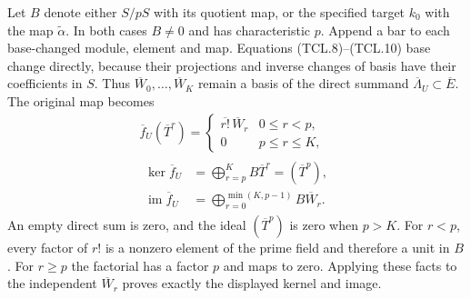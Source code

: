 Let \(B\) denote either \(S/pS\) with its quotient map, or
the specified target \(k_0\) with the map
\(\widetilde\alpha\). In both cases \(B\ne0\) and has
characteristic \(p\). Append a bar to each base-changed module,
element and map. Equations (TCL.8)--(TCL.10) base change directly,
because their projections and inverse changes of basis have their
coefficients in \(S\). Thus \(\overline W_0,\ldots,
\overline W_K\) remain a basis of the direct summand
\(\overline\Lambda_U\subset\overline E\). The original map becomes
\[
 \begin{gathered}
 \overline f_U(\overline T^r)=
 \begin{cases}
  \overline{r!}\,\overline W_r&0\leq r<p,\\
  0&p\leq r\leq K,
 \end{cases}\\
 \begin{aligned}
 \ker\overline f_U
    &=\bigoplus_{r=p}^K B\overline T^r=(\overline T^p),\\
 \operatorname{im}\overline f_U
    &=\bigoplus_{r=0}^{\min(K,p-1)}B\overline W_r.
 \end{aligned}
 \end{gathered}
 \tag{TCL.16}\label{CFStage:eq:tcl-reduced-map}
\]
An empty direct sum is zero, and the ideal \((\overline T^p)\)
is zero when \(p>K\). For \(r<p\), every factor of \(r!\)
is a nonzero element of the prime field and therefore a unit in
\(B\). For \(r\geq p\) the factorial has a factor \(p\)
and maps to zero. Applying these facts to the independent
\(\overline W_r\) proves exactly the displayed kernel and image.

